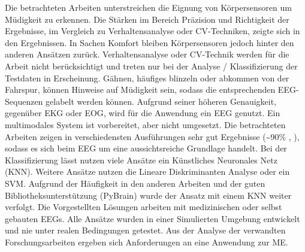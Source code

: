 Die betrachteten Arbeiten unterstreichen die Eignung von Körpersensoren  um Müdigkeit zu erkennen. Die Stärken im Bereich Präzision und Richtigkeit der Ergebnisse, im Vergleich zu Verhaltensanalyse oder CV-Techniken, zeigte sich in den Ergebnissen. In Sachen Komfort bleiben  Körpersensoren jedoch hinter den anderen Ansätzen zurück. Verhaltensanalyse oder CV-Technik werden für die Arbeit nicht berücksichtigt und treten nur bei der Analyse / Klassifizierung der Testdaten in Erscheinung. Gähnen, häufiges blinzeln oder abkommen von der Fahrspur, können Hinweise auf Müdigkeit sein, sodass die entsprechenden EEG-Sequenzen gelabelt werden können. 
Aufgrund seiner höheren Genauigkeit, gegenüber EKG oder EOG, wird für die Anwendung ein EEG genutzt. Ein multimodales System ist vorbereitet, aber nicht umgesetzt. Die betrachteten Arbeiten zeigen in verschiedensten Ausführungen sehr gut Ergebnisse (\textasciitilde 90\% \cite{Lin05eeg-baseddrowsiness}, \cite{Subasi:2005:ARA:1707423.1707550}), sodass es sich beim EEG um eine aussichtsreiche Grundlage handelt. 
Bei der Klassifizierung lässt nutzen viele Ansätze ein Künstliches Neuronales Netz  (KNN)\cite{Subasi:2005:ARA:1707423.1707550}\cite{Vuckovic2002349}\cite{wilson_890161}\cite{khalifa_893852}. Weitere Ansätze nutzen die Lineare Diskriminanten Analyse\cite{Vicente_6164509}\cite{Khushaba_5580017} oder ein SVM\cite{Park:2009:DDD:1667780.1667798}\cite{zhang_6513058}. Aufgrund der Häufigkeit in den anderen Arbeiten und der guten Bibliotheksunterstützung (PyBrain) wurde der Ansatz mit einem KNN weiter verfolgt. Die Vorgestellten Lösungen arbeiten mit medizinischen oder selbst gebauten EEGs. Alle Ansätze wurden in einer Simulierten Umgebung entwickelt und nie unter realen Bedingungen getestet. Aus der Analyse der verwandten Forschungsarbeiten ergeben sich Anforderungen an eine Anwendung zur \acl{ME}. 